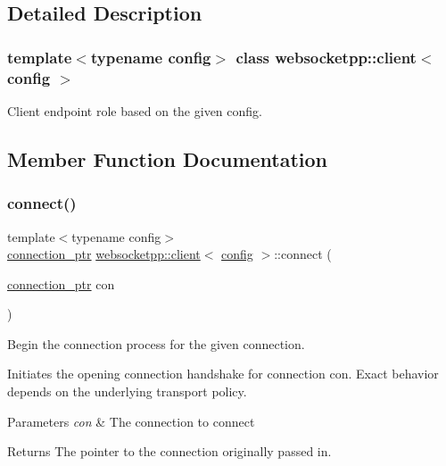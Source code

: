 \subsection{Detailed Description}
\subsubsection*{template$<$typename config$>$\newline
class websocketpp\+::client$<$ config $>$}

Client endpoint role based on the given config. 

\subsection{Member Function Documentation}
\mbox{\label{classwebsocketpp_1_1client_a818c30343180123bf1fee6dc21524bae}} 
\subsubsection{\texorpdfstring{connect()}{connect()}}
{\footnotesize\ttfamily template$<$typename config$>$ \\
\mbox{\hyperlink{classwebsocketpp_1_1client_a2e187bbb2beac676bbfbc2e8065de83e}{connection\+\_\+ptr}} \mbox{\hyperlink{classwebsocketpp_1_1client}{websocketpp\+::client}}$<$ \mbox{\hyperlink{classconfig}{config}} $>$\+::connect (\begin{DoxyParamCaption}\item[{\mbox{\hyperlink{classwebsocketpp_1_1client_a2e187bbb2beac676bbfbc2e8065de83e}{connection\+\_\+ptr}}}]{con }\end{DoxyParamCaption})\hspace{0.3cm}{\ttfamily [inline]}}



Begin the connection process for the given connection. 

Initiates the opening connection handshake for connection con. Exact behavior depends on the underlying transport policy.


\begin{DoxyParams}{Parameters}
{\em con} & The connection to connect\\
\hline
\end{DoxyParams}
\begin{DoxyReturn}{Returns}
The pointer to the connection originally passed in. 
\end{DoxyReturn}
\mbox{\label{classwebsocketpp_1_1client_aa95cec974921e32bc37a61c683ae240d}} 
